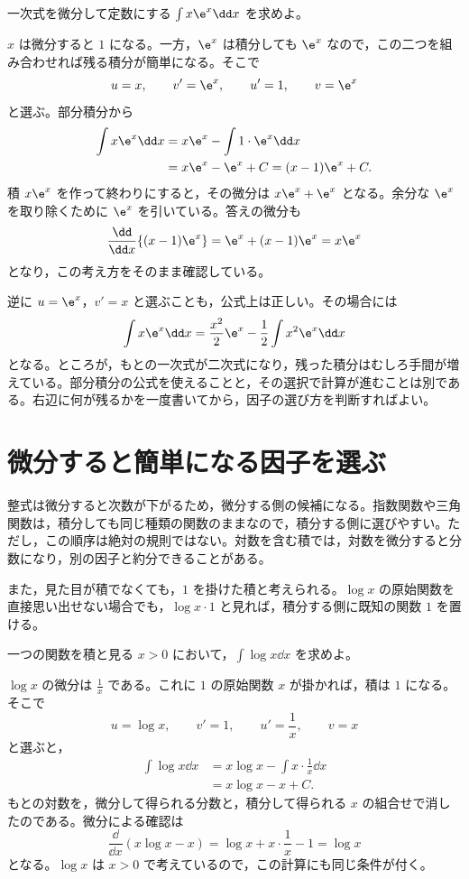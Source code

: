 \begin{example}{一次式を微分して定数にする}
$\int x\e^x\dd x$ を求めよ。
\end{example}

$x$ は微分すると $1$ になる。一方，$\e^x$ は積分しても $\e^x$ なので，この二つを組み合わせれば残る積分が簡単になる。そこで
\[
 u=x,\qquad v'=\e^x,
 \qquad u'=1,\qquad v=\e^x
\]
と選ぶ。部分積分から
\[
\begin{aligned}
 \int x\e^x\dd x
 &=x\e^x-\int 1\cdot\e^x\dd x\\
 &=x\e^x-\e^x+C
 =(x-1)\e^x+C.
\end{aligned}
\]
積 $x\e^x$ を作って終わりにすると，その微分は $x\e^x+\e^x$ となる。余分な $\e^x$ を取り除くために $\e^x$ を引いている。答えの微分も
\[
 \frac{\dd}{\dd x}\{(x-1)\e^x\}
 =\e^x+(x-1)\e^x=x\e^x
\]
となり，この考え方をそのまま確認している。

逆に $u=\e^x$，$v'=x$ と選ぶことも，公式上は正しい。その場合には
\[
 \int x\e^x\dd x
 =\frac{x^2}{2}\e^x-\frac12\int x^2\e^x\dd x
\]
となる。ところが，もとの一次式が二次式になり，残った積分はむしろ手間が増えている。部分積分の公式を使えることと，その選択で計算が進むことは別である。右辺に何が残るかを一度書いてから，因子の選び方を判断すればよい。

\section{微分すると簡単になる因子を選ぶ}\label{節:部分積分の因子選択}

整式は微分すると次数が下がるため，微分する側の候補になる。指数関数や三角関数は，積分しても同じ種類の関数のままなので，積分する側に選びやすい。ただし，この順序は絶対の規則ではない。対数を含む積では，対数を微分すると分数になり，別の因子と約分できることがある。

また，見た目が積でなくても，$1$ を掛けた積と考えられる。$\log x$ の原始関数を直接思い出せない場合でも，$\log x\cdot1$ と見れば，積分する側に既知の関数 $1$ を置ける。

\begin{example}{一つの関数を積と見る}
$x>0$ において，$\int\log x\dd x$ を求めよ。
\end{example}

$\log x$ の微分は $\frac1x$ である。これに $1$ の原始関数 $x$ が掛かれば，積は $1$ になる。そこで
\[
 u=\log x,\qquad v'=1,
 \qquad u'=\frac1x,\qquad v=x
\]
と選ぶと，
\[
\begin{aligned}
 \int\log x\dd x
 &=x\log x-\int x\cdot\frac1x\dd x\\
 &=x\log x-x+C.
\end{aligned}
\]
もとの対数を，微分して得られる分数と，積分して得られる $x$ の組合せで消したのである。微分による確認は
\[
 \frac{\dd}{\dd x}(x\log x-x)
 =\log x+x\cdot\frac1x-1=\log x
\]
となる。$\log x$ は $x>0$ で考えているので，この計算にも同じ条件が付く。

